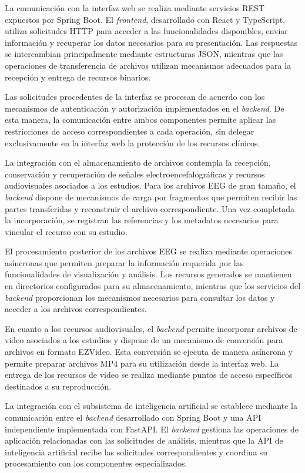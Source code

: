 La comunicación con la interfaz web se realiza mediante servicios REST expuestos por Spring Boot. El \textit{frontend}, desarrollado con React y TypeScript, utiliza solicitudes HTTP para acceder a las funcionalidades disponibles, enviar información y recuperar los datos necesarios para su presentación. Las respuestas se intercambian principalmente mediante estructuras JSON, mientras que las operaciones de transferencia de archivos utilizan mecanismos adecuados para la recepción y entrega de recursos binarios.

Las solicitudes procedentes de la interfaz se procesan de acuerdo con los mecanismos de autenticación y autorización implementados en el \textit{backend}. De esta manera, la comunicación entre ambos componentes permite aplicar las restricciones de acceso correspondientes a cada operación, sin delegar exclusivamente en la interfaz web la protección de los recursos clínicos.

La integración con el almacenamiento de archivos contempla la recepción, conservación y recuperación de señales electroencefalográficas y recursos audiovisuales asociados a los estudios. Para los archivos EEG de gran tamaño, el \textit{backend} dispone de mecanismos de carga por fragmentos que permiten recibir las partes transferidas y reconstruir el archivo correspondiente. Una vez completada la incorporación, se registran las referencias y los metadatos necesarios para vincular el recurso con su estudio.

El procesamiento posterior de los archivos EEG se realiza mediante operaciones asíncronas que permiten preparar la información requerida por las funcionalidades de visualización y análisis. Los recursos generados se mantienen en directorios configurados para su almacenamiento, mientras que los servicios del \textit{backend} proporcionan los mecanismos necesarios para consultar los datos y acceder a los archivos correspondientes.

En cuanto a los recursos audiovisuales, el \textit{backend} permite incorporar archivos de video asociados a los estudios y dispone de un mecanismo de conversión para archivos en formato EZVideo. Esta conversión se ejecuta de manera asíncrona y permite preparar archivos MP4 para su utilización desde la interfaz web. La entrega de los recursos de video se realiza mediante puntos de acceso específicos destinados a su reproducción.

La integración con el subsistema de inteligencia artificial se establece mediante la comunicación entre el \textit{backend} desarrollado con Spring Boot y una API independiente implementada con FastAPI. El \textit{backend} gestiona las operaciones de aplicación relacionadas con las solicitudes de análisis, mientras que la API de inteligencia artificial recibe las solicitudes correspondientes y coordina su procesamiento con los componentes especializados.

